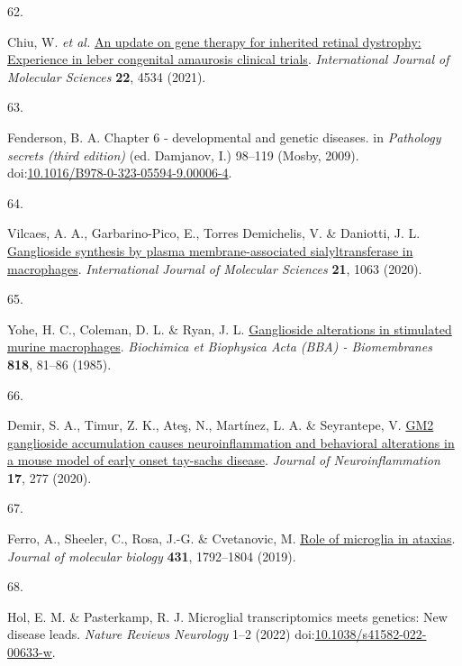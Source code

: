 \documentclass[
]{article}
\newlength{\cslhangindent}
\newlength{\csllabelwidth}
\newenvironment{CSLReferences}[2] %
 {\begin{list}{}{%
  \setlength{\itemindent}{0pt}
  \setlength{\leftmargin}{0pt}
  \setlength{\parsep}{0pt}
  \ifodd #1
   \setlength{\leftmargin}{\cslhangindent}
   \setlength{\itemindent}{-1\cslhangindent}
  \fi
  \setlength{\itemsep}{#2\baselineskip}}}
 {\end{list}}
\newcommand{\CSLLeftMargin}[1]{\parbox[t]{\csllabelwidth}{\strut#1\strut}}
\newcommand{\CSLRightInline}[1]{\parbox[t]{\linewidth - \csllabelwidth}{\strut#1\strut}}
\begin{document}
\begin{CSLReferences}{0}{0}
\CSLLeftMargin{62. }%
\CSLRightInline{Chiu, W. \emph{et al.}
\href{https://doi.org/10.3390/ijms22094534}{An update on gene therapy
for inherited retinal dystrophy: Experience in leber congenital
amaurosis clinical trials}. \emph{International Journal of Molecular
Sciences} \textbf{22}, 4534 (2021).}

\CSLLeftMargin{63. }%
\CSLRightInline{Fenderson, B. A. Chapter 6 - developmental and genetic
diseases. in \emph{Pathology secrets (third edition)} (ed. Damjanov, I.)
98--119 (Mosby, 2009).
doi:\href{https://doi.org/10.1016/B978-0-323-05594-9.00006-4}{10.1016/B978-0-323-05594-9.00006-4}.}

\CSLLeftMargin{64. }%
\CSLRightInline{Vilcaes, A. A., Garbarino-Pico, E., Torres Demichelis,
V. \& Daniotti, J. L.
\href{https://doi.org/10.3390/ijms21031063}{Ganglioside synthesis by
plasma membrane-associated sialyltransferase in macrophages}.
\emph{International Journal of Molecular Sciences} \textbf{21}, 1063
(2020).}

\CSLLeftMargin{65. }%
\CSLRightInline{Yohe, H. C., Coleman, D. L. \& Ryan, J. L.
\href{https://doi.org/10.1016/0005-2736(85)90141-5}{Ganglioside
alterations in stimulated murine macrophages}. \emph{Biochimica et
Biophysica Acta (BBA) - Biomembranes} \textbf{818}, 81--86 (1985).}

\CSLLeftMargin{66. }%
\CSLRightInline{Demir, S. A., Timur, Z. K., Ateş, N., Martínez, L. A. \&
Seyrantepe, V. \href{https://doi.org/10.1186/s12974-020-01947-6}{GM2
ganglioside accumulation causes neuroinflammation and behavioral
alterations in a mouse model of early onset tay-sachs disease}.
\emph{Journal of Neuroinflammation} \textbf{17}, 277 (2020).}

\CSLLeftMargin{67. }%
\CSLRightInline{Ferro, A., Sheeler, C., Rosa, J.-G. \& Cvetanovic, M.
\href{https://doi.org/10.1016/j.jmb.2019.01.016}{Role of microglia in
ataxias}. \emph{Journal of molecular biology} \textbf{431}, 1792--1804
(2019).}

\CSLLeftMargin{68. }%
\CSLRightInline{Hol, E. M. \& Pasterkamp, R. J. Microglial
transcriptomics meets genetics: New disease leads. \emph{Nature Reviews
Neurology} 1--2 (2022)
doi:\href{https://doi.org/10.1038/s41582-022-00633-w}{10.1038/s41582-022-00633-w}.}


\end{CSLReferences}
\end{document}
